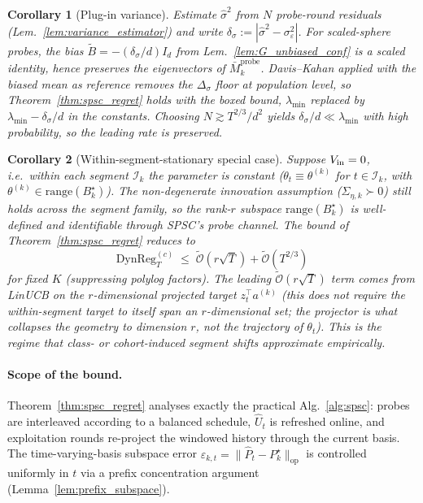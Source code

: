 \documentclass{article}
\newcommand{\op}{\mathrm{op}}
\newcommand{\cI}{\mathcal{I}}
\newcommand{\tilO}{\widetilde{\mathcal{O}}}
\newcommand{\DynReg}{\mathrm{DynReg}}
\newtheorem{corollary}{Corollary}
\begin{document}
\begin{corollary}[Plug-in variance]
\label{cor:plugin_variance}
Estimate $\widehat\sigma^2$ from $N$ probe-round residuals
(Lem.~\ref{lem:variance_estimator}) and write
$\delta_\sigma:=|\widehat\sigma^2-\sigma_\varepsilon^2|$. For
scaled-sphere probes, the bias
$\widetilde B=-(\delta_\sigma/d)I_d$ from
Lem.~\ref{lem:G_unbiased_conf} is a scaled identity, hence preserves
the eigenvectors of $\bar M_k^{\mathrm{probe}}$. Davis--Kahan applied
with the biased mean as reference removes the
$\Delta_\sigma$ floor at population level, so
Theorem~\ref{thm:spsc_regret} holds with the boxed bound,
$\lambda_{\min}$ replaced by $\lambda_{\min}-\delta_\sigma/d$ in the
constants. Choosing $N\gtrsim T^{2/3}/d^2$ yields
$\delta_\sigma/d\ll\lambda_{\min}$ with high probability, so the
leading rate is preserved.
\end{corollary}

\begin{corollary}[Within-segment-stationary special case]
\label{cor:stationary_within}
Suppose $V_{\rm in}=0$, i.e.\ within each segment $\cI_k$ the parameter
is constant ($\theta_t\equiv\theta^{(k)}$ for $t\in\cI_k$, with
$\theta^{(k)}\in\mathrm{range}(B^\star_k)$). The non-degenerate
innovation assumption ($\Sigma_{\eta,k}\succ 0$) still holds
\emph{across} the segment family, so the rank-$r$ subspace
$\mathrm{range}(B^\star_k)$ is well-defined and identifiable through
SPSC's probe channel. The bound of Theorem~\ref{thm:spsc_regret}
reduces to
\[
\DynReg_T^{(c)} \;\le\; \tilO(r\sqrt{T}) + \tilO(T^{2/3})
\]
for fixed $K$ (suppressing polylog factors). The leading
$\tilO(r\sqrt{T})$ term comes from LinUCB on the $r$-dimensional
projected target $z_t^\top a^{(k)}$ (this does not require the within-segment
target to itself span an $r$-dimensional set; the projector is what
collapses the geometry to dimension $r$, not the trajectory of
$\theta_t$). This is the regime that class- or cohort-induced segment
shifts approximate empirically.
\end{corollary}

\paragraph{Scope of the bound.} Theorem~\ref{thm:spsc_regret} analyses
exactly the practical Alg.~\ref{alg:spsc}: probes are interleaved
according to a balanced schedule, $\widehat U_t$ is refreshed online,
and exploitation rounds re-project the windowed history through the
current basis. The time-varying-basis subspace error
$\varepsilon_{k,t}=\|\widehat P_t-P_k^\star\|_\op$ is controlled
uniformly in $t$ via a prefix concentration argument
(Lemma~\ref{lem:prefix_subspace}).
\end{document}
